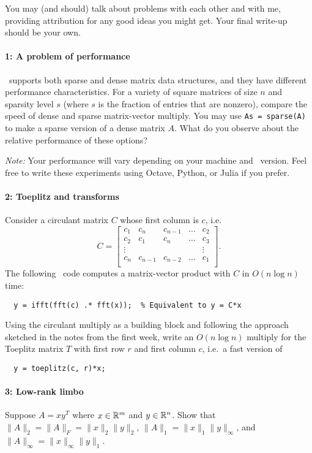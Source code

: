 \documentclass[12pt, leqno]{article} %
\begin{document}

You may (and should) talk about problems with each other and with me,
providing attribution for any good ideas you might get.  Your final
write-up should be your own.

\paragraph*{1: A problem of performance}
\matlab\ supports both sparse and dense matrix data structures,
and they have different performance characteristics.  For a variety
of square matrices of size $n$ and sparsity level $s$ (where $s$ is
the fraction of entries that are nonzero), compare the speed of dense
and sparse matrix-vector multiply.  You may use {\tt As = sparse(A)}
to make a sparse version of a dense matrix $A$.  What do you observe
about the relative performance of these options?

{\em Note:} Your performance will vary depending on your machine and
\matlab\ version.  Feel free to write these experiments using
Octave, Python, or Julia if you prefer.

\paragraph*{2: Toeplitz and transforms}
Consider a circulant matrix $C$ whose first column is $c$, i.e.
\[
  C =
  \begin{bmatrix}
  c_1 & c_n & c_{n-1} & \ldots & c_2 \\
  c_2 & c_1 & c_{n} & \ldots & c_3 \\
  \vdots & & & & \vdots \\
  c_n & c_{n-1} & c_{n-2} & \ldots & c_1 \\
  \end{bmatrix}.
\]
The following \matlab\ code computes a matrix-vector product with $C$
in $O(n \log n)$ time:
\begin{lstlisting}
  y = ifft(fft(c) .* fft(x));  % Equivalent to y = C*x
\end{lstlisting}
Using the circulant multiply as a building block and following the
approach sketched in the notes from the first week, write an $O(n \log n)$
multiply for the Toeplitz matrix $T$ with first row $r$ and first column $c$,
i.e.~a fast version of
\begin{lstlisting}
  y = toeplitz(c, r)*x;
\end{lstlisting}

\paragraph*{3: Low-rank limbo}
Suppose $A = xy^T$ where $x \in \mathbb{R}^m$ and $y \in \mathbb{R}^n$.  Show that
$\|A\|_2 = \|A\|_F = \|x\|_2 \|y\|_2$,
$\|A\|_1 = \|x\|_1 \|y\|_\infty$, and
$\|A\|_\infty = \|x\|_\infty \|y\|_1$.
\end{document}
